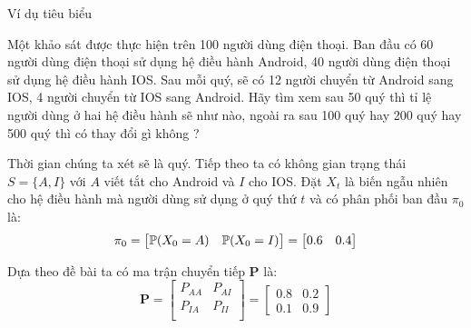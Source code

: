\begin{frame}{Ví dụ tiêu biểu}
    \begin{mypro*}{}
Một khảo sát được thực hiện trên 100 người dùng điện thoại. Ban đầu có 60 người dùng điện thoại sử dụng hệ điều hành Android, 40 người dùng điện thoại sử dụng hệ điều hành IOS. Sau mỗi quý, sẽ có 12 người chuyển từ Android sang IOS, 4 người chuyển từ IOS sang Android. Hãy tìm xem sau 50 quý thì tỉ lệ người dùng ở hai hệ điều hành sẽ như nào, ngoài ra sau 100 quý hay 200 quý hay 500 quý thì có thay đổi gì không ?
    \end{mypro*}
\begin{mysol*}{}
    Thời gian chúng ta xét sẽ là quý. Tiếp theo ta có không gian trạng thái $S = \{A, I\}$ với $A$ viết tắt cho Android và $I$ cho IOS. Đặt $X_t$ là biến ngẫu nhiên cho hệ điều hành mà người dùng sử dụng ở quý thứ $t$ và có phân phối ban đầu $\pi_0$ là:
$$
\pi_0 = \begin{bmatrix}
    \P(X_0 = A) & \P(X_0 = I)
\end{bmatrix} = \begin{bmatrix}
    0.6 & 0.4
\end{bmatrix}
$$

\noindent Dựa theo đề bài ta có ma trận chuyển tiếp $\mathbf{P}$ là:
$$
\mathbf{P} = \begin{bmatrix}
    P_{AA} & P_{AI} \\
    P_{IA} & P_{II} \\
\end{bmatrix} = \begin{bmatrix}
    0.8 & 0.2 \\
    0.1 & 0.9 
\end{bmatrix}
$$
\end{mysol*}
\end{frame}
